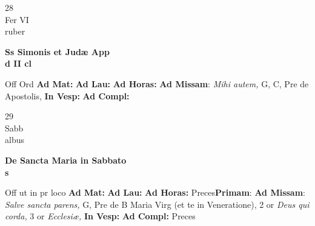 \documentclass[10pt, openany]{book}
\begin{document}
        \begin{center}
            \begin{minipage}{3.5in}
                \vspace{2em}
                \begin{minipage}{0.5in}
                    {\Huge 28} \\
                    {\normalsize Fer VI} \\
                    {\normalsize ruber}
                \end{minipage}
                \begin{minipage}{3.0in}
                    \textbf{ \large Ss Simonis et Judæ App \\
                    \textnormal{\normalsize d II cl}} \\ 
                \end{minipage}
                \begin{justify}Off Ord
                    \textbf{Ad Mat: }
                    \textbf{Ad Lau: }
                    \textbf{Ad Horas: }\textbf{Ad Missam}: \textit{Mihi autem,} G, C, Pre de Apostolis,  
                    \textbf{In Vesp: }
                    \textbf{Ad Compl: }
                \end{justify}
            \end{minipage}
        \end{center}
    
        \begin{center}
            \begin{minipage}{3.5in}
                \vspace{2em}
                \begin{minipage}{0.5in}
                    {\Huge 29} \\
                    {\normalsize Sabb} \\
                    {\normalsize albus}
                \end{minipage}
                \begin{minipage}{3.0in}
                    \textbf{ \large De Sancta Maria in Sabbato \\
                    \textnormal{\normalsize s}} \\ 
                \end{minipage}
                \begin{justify}Off ut in pr loco
                    \textbf{Ad Mat: }
                    \textbf{Ad Lau: }
                    \textbf{Ad Horas: }Preces\textbf{Primam}: \textbf{Ad Missam}: \textit{Salve sancta parens,} G, Pre de B Maria Virg (et te in Veneratione), 2 or \textit{Deus qui corda,} 3 or \textit{Ecclesiæ,}  
                    \textbf{In Vesp: }
                    \textbf{Ad Compl: }Preces
                \end{justify}
            \end{minipage}
        \end{center}
    
\end{document}
